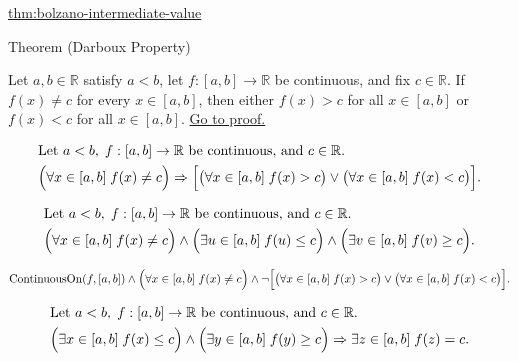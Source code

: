 \begin{remark*}[Dependencies]
\hyperref[thm:bolzano-intermediate-value]{thm:bolzano-intermediate-value}
\end{remark*}


\begin{theorembox}{Theorem (Darboux Property)}
\begin{theorem}
\label{thm:darboux-property}
Let $a,b\in\mathbb{R}$ satisfy $a<b$, let $f:[a,b]\to\mathbb{R}$ be continuous, and fix $c\in\mathbb{R}$. If $f(x)\neq c$ for every $x\in[a,b]$, then either $f(x)>c$ for all $x\in[a,b]$ or $f(x)<c$ for all $x\in[a,b]$.
\hyperref[prf:darboux-property]{Go to proof.}
\end{theorem}
\end{theorembox}

\begin{remark*}
\[
\begin{aligned}
&\text{Let } a<b,\; f:[a,b]\to\mathbb{R} \text{ be continuous, and } c\in\mathbb{R}.\\
&\Bigl(\forall x\in[a,b]\; f(x)\neq c\Bigr)
\Rightarrow
\Bigl[\bigl(\forall x\in[a,b]\; f(x)>c\bigr)\lor\bigl(\forall x\in[a,b]\; f(x)<c\bigr)\Bigr].
\end{aligned}
\]
\end{remark*}

\begin{remark*}
\[
\begin{aligned}
&\text{Let } a<b,\; f:[a,b]\to\mathbb{R} \text{ be continuous, and } c\in\mathbb{R}.\\
&\Bigl(\forall x\in[a,b]\; f(x)\neq c\Bigr)
\land
\Bigl(\exists u\in[a,b]\; f(u)\le c\Bigr)
\land
\Bigl(\exists v\in[a,b]\; f(v)\ge c\Bigr).
\end{aligned}
\]
\end{remark*}

\begin{remark*}
\[
\operatorname{ContinuousOn}(f,[a,b])
\land
\Bigl(\forall x\in[a,b]\; f(x)\neq c\Bigr)
\land
\neg\Bigl[
\bigl(\forall x\in[a,b]\; f(x)>c\bigr)
\lor
\bigl(\forall x\in[a,b]\; f(x)<c\bigr)
\Bigr].
\]
\end{remark*}

\begin{remark*}
\[
\begin{aligned}
&\text{Let } a<b,\; f:[a,b]\to\mathbb{R} \text{ be continuous, and } c\in\mathbb{R}.\\
&\Bigl(\exists x\in[a,b]\; f(x)\le c\Bigr)
\land
\Bigl(\exists y\in[a,b]\; f(y)\ge c\Bigr)
\Rightarrow
\exists z\in[a,b]\; f(z)=c.
\end{aligned}
\]
\end{remark*}


